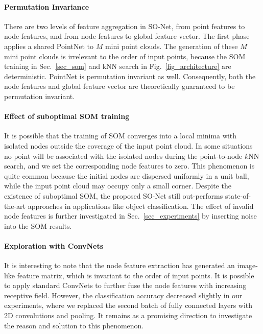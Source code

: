 \documentclass[10pt,twocolumn,letterpaper]{article}
\begin{document}
\paragraph{Permutation Invariance}
There are two levels of feature aggregation in SO-Net, from point features to node features, and from node features to global feature vector. The first phase applies a shared PointNet to $M$ mini point clouds. The generation of these $M$ mini point clouds is irrelevant to the order of input points, because the SOM training in Sec.~\ref{sec_som} and kNN search in Fig.~\ref{fig_architecture} are deterministic. PointNet \cite{qi2016pointnet} is permutation invariant as well. Consequently, both the node features and global feature vector are theoretically guaranteed to be permutation invariant.

\paragraph{Effect of suboptimal SOM training}
It is possible that the training of SOM converges into a local minima with isolated nodes outside the coverage of the input point cloud. In some situations no point will be associated with the isolated nodes during the point-to-node $k$NN search, and we set the corresponding node features to zero. This phenomenon is quite common because the initial nodes are dispersed uniformly in a unit ball, while the input point cloud may occupy only a small corner. Despite the existence of suboptimal SOM, the proposed SO-Net still out-performs state-of-the-art approaches in applications like object classification. The effect of invalid node features is further investigated in Sec.~\ref{sec_experiments} by inserting noise into the SOM results.

\paragraph{Exploration with ConvNets}
It is interesting to note that the node feature extraction has generated an image-like feature matrix, which is invariant to the order of input points. It is possible to apply standard ConvNets to further fuse the node features with increasing receptive field. However, the classification accuracy decreased slightly in our experiments, where we replaced the second batch of fully connected layers with 2D convolutions and pooling. It remains as a promising direction to investigate the reason and solution to this phenomenon.
\end{document}
